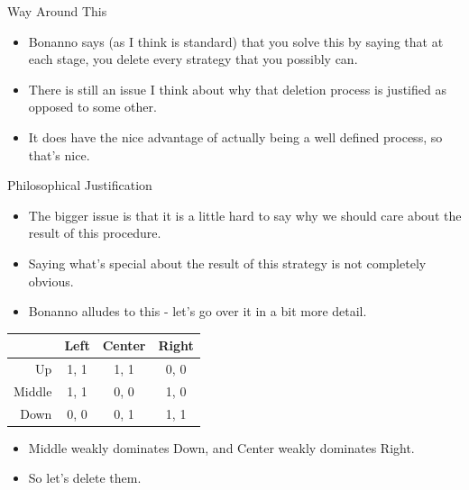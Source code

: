 \documentclass[
  14pt,
  letterpaper,
  ignorenonframetext,
  aspectratio=169,
  handout]{beamer}
\providecommand{\tightlist}{%
  \setlength{\itemsep}{0pt}\setlength{\parskip}{0pt}}\usepackage{longtable,booktabs,array}
\let\olditem\item
\renewcommand{\item}{%
\olditem\vspace{6pt}}
\begin{document}
\begin{frame}{Way Around This}
\protect\hypertarget{way-around-this}{}
\begin{itemize}[<+->]
\tightlist
\item
  Bonanno says (as I think is standard) that you solve this by saying
  that at each stage, you delete every strategy that you possibly can.
\item
  There is still an issue I think about why that deletion process is
  justified as opposed to some other.
\item
  It does have the nice advantage of actually being a well defined
  process, so that's nice.
\end{itemize}
\end{frame}

\begin{frame}{Philosophical Justification}
\protect\hypertarget{philosophical-justification}{}
\begin{itemize}[<+->]
\tightlist
\item
  The bigger issue is that it is a little hard to say why we should care
  about the result of this procedure.
\item
  Saying what's special about the result of this strategy is not
  completely obvious.
\item
  Bonanno alludes to this - let's go over it in a bit more detail.
\end{itemize}
\end{frame}

\begin{frame}
\begin{table}[!h]
\centering
\begin{tabular}[t]{>{}r|ccc}
\toprule
 & Left & Center & Right\\
\midrule
Up & 1, 1 & 1, 1 & 0, 0\\
Middle & 1, 1 & 0, 0 & 1, 0\\
Down & 0, 0 & 0, 1 & 1, 1\\
\bottomrule
\end{tabular}
\end{table}

\begin{itemize}[<+->]
\tightlist
\item
  Middle weakly dominates Down, and Center weakly dominates Right.
\item
  So let's delete them.
\end{itemize}
\end{frame}
\end{document}
